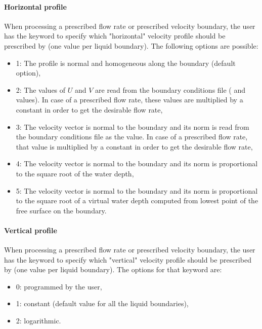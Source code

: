 \paragraph{Horizontal profile}

When processing a prescribed flow rate or prescribed velocity boundary, the
user has the keyword  to specify which "horizontal"
velocity profile should be prescribed by  (one value per liquid
boundary).
The following options are possible:

\begin{itemize}
\item 1: The profile is normal and homogeneous along the boundary (default
option),

\item 2: The values of $U$ and $V$ are read from the boundary
conditions file ( and  values).
In case of a prescribed flow rate, these values are multiplied by a constant
in order to get the desirable flow rate,

\item 3: The velocity vector is normal to the boundary and its norm is read
from the boundary conditions file as the  value. In case of a
prescribed flow rate, that value is multiplied by a constant in order to get
the desirable flow rate,

\item 4: The velocity vector is normal to the boundary and its norm is
proportional to the square root of the water depth,

\item 5: The velocity vector is normal to the boundary and its norm is
proportional to the square root of a virtual water depth computed from lowest
point of the free surface on the boundary.
\end{itemize}

\paragraph{ Vertical profile}

When processing a prescribed flow rate or prescribed velocity boundary, the
user has the keyword  to specify which
"vertical" velocity profile should be prescribed by 
(one value per liquid boundary).
The options for that keyword are:

\begin{itemize}
\item 0: programmed by the user,

\item 1: constant (default value for all the liquid boundaries),

\item 2: logarithmic.
\end{itemize}

